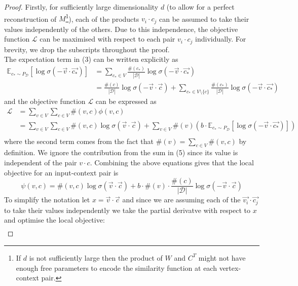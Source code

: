 \documentclass[a4paper]{article}
\renewcommand{\E}{\mathbb E}
\newcommand{\D}{\mathcal D}
\begin{document}
\begin{proof}
  Firstly, for sufficiently large dimensionality $d$ (to allow for a perfect
  reconstruction of $M$\footnote{If $d$ is not sufficiently large then the product of $W$ and $C^T$ might not have enough free parameters to encode the similarity function at each vertex-context pair.}), each of the products $v_i \cdot c_j$ can be assumed to
  take their values independently of the others. Due to this independence, the objective function $\mathcal{L}$ can be maximised with
  respect to each pair $v_i \cdot c_j$ individually. For brevity, we drop the subscripts throughout the proof.\\
  The expectation term in (3) can be written explicitly as
  \begin{align}
    \E_{c_* \sim P_{\D}}[\log{\sigma(-\vec{v} \cdot \vec{c_*})}] &= \sum_{c_* \in V}{\frac{\#(c_*)}{|\D|} \log{\sigma(-\vec{v} \cdot \vec{c_*})}}\\
                                                                             &= \frac{\#(c)}{|\D|} \log{\sigma(-\vec{v} \cdot \vec{c})} + \sum_{c_*\in V \setminus \{c\}}{\frac{\#(c_*)}{|\D|} \log{\sigma(-\vec{v} \cdot \vec{c_*})}}
  \end{align}
  and the objective function $\mathcal{L}$ can be expressed as
  \begin{align*}
    \mathcal{L} &= \sum_{v \in V}\sum_{c \in V}\#(v, c)\phi(v,c)\\
    &=\sum_{v \in V}\sum_{c \in V}\#(v, c)\log{\sigma(\vec{v} \cdot \vec{c})} + \sum_{v \in V}\#(v)\left(b \cdot \E_{c _* \sim P_{\D}}[\log{\sigma(-\vec{v} \cdot \vec{c_*})}] \right)\\
  \end{align*}
  where the second term comes from the fact that $\#(v) = \sum_{c \in V}\#(v,c)$
  by definition. We ignore the contribution from the sum in (5) since its value is independent of the pair $v \cdot c$. Combining the above equations gives that the local objective for an input-context
  pair is
  \begin{equation*}
    \psi(v, c) = \#(v, c)\log{\sigma(\vec{v} \cdot \vec{c})} + b \cdot \#(v)\cdot \frac{\#(c)}{|\D|}\log{\sigma(-\vec{v} \cdot \vec{c})} 
  \end{equation*}
  To simplify the notation let $x = \vec{v} \cdot \vec{c}$ and since we are
  assuming each of the $\vec{v_i} \cdot \vec{c_j}$ to take their values independently we take the partial derivatve with respect to $x$ and optimise
  the local objective:
  \begin{align*}

\end{align*}
\end{proof}
\end{document}
